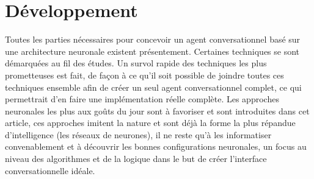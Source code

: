 \section{Développement}

Toutes les parties nécessaires pour concevoir un agent conversationnel basé sur une architecture neuronale existent présentement. Certaines techniques se sont démarquées au fil des études. Un survol rapide des techniques les plus prometteuses est fait, de façon à ce qu'il soit possible de joindre toutes ces techniques ensemble afin de créer un seul agent conversationnel complet, ce qui permettrait d'en faire une implémentation réelle complète. Les approches neuronales les plus aux goûts du jour sont à favoriser et sont introduites dans cet article, ces approches imitent la nature et sont déjà la forme la plus répandue d'intelligence (les réseaux de neurones), il ne reste qu'à les informatiser convenablement et à découvrir les bonnes configurations neuronales, un focus au niveau des algorithmes et de la logique dans le but de créer l'interface conversationnelle idéale. \\






